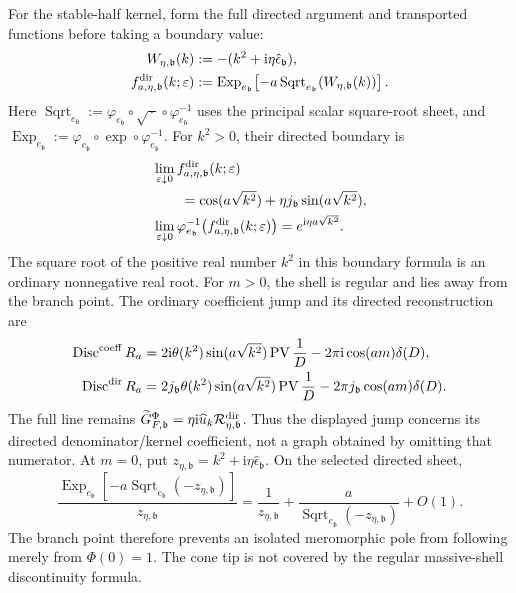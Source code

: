 \documentclass[final,5p,times,twocolumn,numbers,nopreprintline]{elsarticle}
\numberwithin{equation}{section}
\theoremstyle{definition}
\theoremstyle{remark}
\newcommand{\ii}{\mathrm i}
\newcommand{\bb}{\mathfrak b}
\newcommand{\Ph}{\Phi}
\newcommand{\PV}{\operatorname{PV}}
\newcommand{\Disc}{\operatorname{Disc}}
\newcommand{\ee}{e_{\bb}}
\newcommand{\epsvec}{\hat\epsilon_{\bb}}
\newcommand{\je}{j_{\bb}}
\newcommand{\embed}{\varphi_{\ee}}
\newcommand{\ExpDir}{\operatorname{Exp}_{\ee}}
\newcommand{\SqrtDir}{\operatorname{Sqrt}_{\ee}}
\begin{document}
For the stable-half kernel, form the full directed argument and
transported functions before taking a boundary value:
\begin{equation}
\begin{aligned}
 W_{\eta,\bb}(k)&:=-(k^2+\ii\eta\epsvec),\\
 f^{\rm dir}_{a,\eta,\bb}(k;\varepsilon)
   &:=\ExpDir\!\left[-a\SqrtDir(W_{\eta,\bb}(k))\right].
\end{aligned}
 \label{eq:stable-full-directed-kernel}
\end{equation}
Here \(\SqrtDir:=\embed\circ\sqrt{\,\cdot\,}
\circ\embed^{-1}\) uses the principal scalar square-root
sheet, and \(\ExpDir:=\embed\circ\exp\circ\embed^{-1}\).
For \(k^2>0\), their directed boundary is
\begin{equation}
\begin{aligned}
 &\lim_{\varepsilon\downarrow0}
 f^{\rm dir}_{a,\eta,\bb}(k;\varepsilon)\\
 &\qquad=\cos(a\sqrt{k^2})+\eta\je\sin(a\sqrt{k^2}),\\
 &\lim_{\varepsilon\downarrow0}
 \embed^{-1}\!\left(f^{\rm dir}_{a,\eta,\bb}(k;\varepsilon)\right)
       =e^{\ii\eta a\sqrt{k^2}}.
\end{aligned}
 \label{eq:stable-directed-boundary}
\end{equation}
The square root of the positive real number \(k^2\) in this
boundary formula is an ordinary nonnegative real root.
For \(m>0\), the shell is regular and lies away from the branch
point. The ordinary coefficient jump and its directed reconstruction
are
\begin{align}
 \Disc^{\rm coeff}R_a
  &=2\ii\theta(k^2)\sin(a\sqrt{k^2})\PV\frac1D
       -2\pi\ii\cos(am)\delta(D),\nonumber\\
 \Disc^{\rm dir}R_a
  &=2\je\theta(k^2)\sin(a\sqrt{k^2})\PV\frac1D
       -2\pi\je\cos(am)\delta(D).
 \label{eq:stable-disc}
\end{align}
The full line remains
\(\widetilde G^\Ph_{F,\bb}
=\eta\ii\widehat u_k\mathcal R^{\rm dir}_{\eta,\bb}\).
Thus the displayed jump concerns its directed denominator/kernel
coefficient, not a graph obtained by omitting that numerator.
At \(m=0\), put
\(z_{\eta,\bb}=k^2+\ii\eta\epsvec\). On the selected
directed sheet,
\begin{equation}
 \frac{\ExpDir[-a\SqrtDir(-z_{\eta,\bb})]}
              {z_{\eta,\bb}}
 =\frac1{z_{\eta,\bb}}
      +\frac{a}{\SqrtDir(-z_{\eta,\bb})}+O(1).
 \label{eq:massless-branch}
\end{equation}
The branch point therefore prevents an isolated meromorphic pole
from following merely from \(\Ph(0)=1\). The cone tip is not
covered by the regular massive-shell discontinuity formula.
\end{document}
